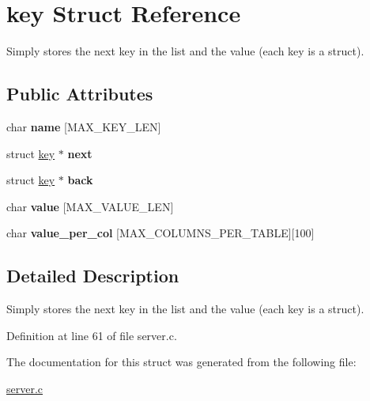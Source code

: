 \hypertarget{structkey}{
\section{key Struct Reference}
\label{structkey}
}


Simply stores the next key in the list and the value (each key is a struct).  


\subsection*{Public Attributes}
\begin{DoxyCompactItemize}
\item 
\hypertarget{structkey_a0b623288221650302593a00fde73b92f}{
char {\bfseries name} \mbox{[}MAX\_\-KEY\_\-LEN\mbox{]}}
\label{structkey_a0b623288221650302593a00fde73b92f}

\item 
\hypertarget{structkey_aed4736b03960b4f3f006e3a04f4871ea}{
struct \hyperlink{structkey}{key} $\ast$ {\bfseries next}}
\label{structkey_aed4736b03960b4f3f006e3a04f4871ea}

\item 
\hypertarget{structkey_a465429424ced5dd170b35a19c528aca8}{
struct \hyperlink{structkey}{key} $\ast$ {\bfseries back}}
\label{structkey_a465429424ced5dd170b35a19c528aca8}

\item 
\hypertarget{structkey_af30e41811ec049771738e94dcbc84c57}{
char {\bfseries value} \mbox{[}MAX\_\-VALUE\_\-LEN\mbox{]}}
\label{structkey_af30e41811ec049771738e94dcbc84c57}

\item 
\hypertarget{structkey_a0bce19c859fd07b4340e278e4568e9a2}{
char {\bfseries value\_\-per\_\-col} \mbox{[}MAX\_\-COLUMNS\_\-PER\_\-TABLE\mbox{]}\mbox{[}100\mbox{]}}
\label{structkey_a0bce19c859fd07b4340e278e4568e9a2}

\end{DoxyCompactItemize}


\subsection{Detailed Description}
Simply stores the next key in the list and the value (each key is a struct). 

Definition at line 61 of file server.c.



The documentation for this struct was generated from the following file:\begin{DoxyCompactItemize}
\item 
\hyperlink{server_8c}{server.c}\end{DoxyCompactItemize}
